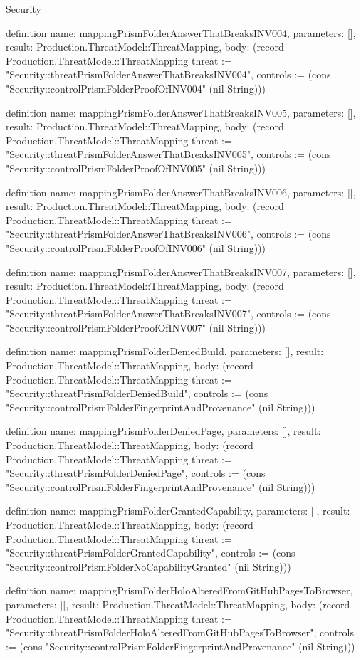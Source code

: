 \begin{lexlean}{Security}
\begin{semanticmodule}
definition{
  name: mappingPrismFolderAnswerThatBreaksINV004,
  parameters: [],
  result: Production.ThreatModel::ThreatMapping,
  body: (record Production.ThreatModel::ThreatMapping {threat := "Security::threatPrismFolderAnswerThatBreaksINV004", controls := (cons "Security::controlPrismFolderProofOfINV004" (nil String))})
}

definition{
  name: mappingPrismFolderAnswerThatBreaksINV005,
  parameters: [],
  result: Production.ThreatModel::ThreatMapping,
  body: (record Production.ThreatModel::ThreatMapping {threat := "Security::threatPrismFolderAnswerThatBreaksINV005", controls := (cons "Security::controlPrismFolderProofOfINV005" (nil String))})
}

definition{
  name: mappingPrismFolderAnswerThatBreaksINV006,
  parameters: [],
  result: Production.ThreatModel::ThreatMapping,
  body: (record Production.ThreatModel::ThreatMapping {threat := "Security::threatPrismFolderAnswerThatBreaksINV006", controls := (cons "Security::controlPrismFolderProofOfINV006" (nil String))})
}

definition{
  name: mappingPrismFolderAnswerThatBreaksINV007,
  parameters: [],
  result: Production.ThreatModel::ThreatMapping,
  body: (record Production.ThreatModel::ThreatMapping {threat := "Security::threatPrismFolderAnswerThatBreaksINV007", controls := (cons "Security::controlPrismFolderProofOfINV007" (nil String))})
}

definition{
  name: mappingPrismFolderDeniedBuild,
  parameters: [],
  result: Production.ThreatModel::ThreatMapping,
  body: (record Production.ThreatModel::ThreatMapping {threat := "Security::threatPrismFolderDeniedBuild", controls := (cons "Security::controlPrismFolderFingerprintAndProvenance" (nil String))})
}

definition{
  name: mappingPrismFolderDeniedPage,
  parameters: [],
  result: Production.ThreatModel::ThreatMapping,
  body: (record Production.ThreatModel::ThreatMapping {threat := "Security::threatPrismFolderDeniedPage", controls := (cons "Security::controlPrismFolderFingerprintAndProvenance" (nil String))})
}

definition{
  name: mappingPrismFolderGrantedCapability,
  parameters: [],
  result: Production.ThreatModel::ThreatMapping,
  body: (record Production.ThreatModel::ThreatMapping {threat := "Security::threatPrismFolderGrantedCapability", controls := (cons "Security::controlPrismFolderNoCapabilityGranted" (nil String))})
}

definition{
  name: mappingPrismFolderHoloAlteredFromGitHubPagesToBrowser,
  parameters: [],
  result: Production.ThreatModel::ThreatMapping,
  body: (record Production.ThreatModel::ThreatMapping {threat := "Security::threatPrismFolderHoloAlteredFromGitHubPagesToBrowser", controls := (cons "Security::controlPrismFolderFingerprintAndProvenance" (nil String))})
}


\end{semanticmodule}
\end{lexlean}
